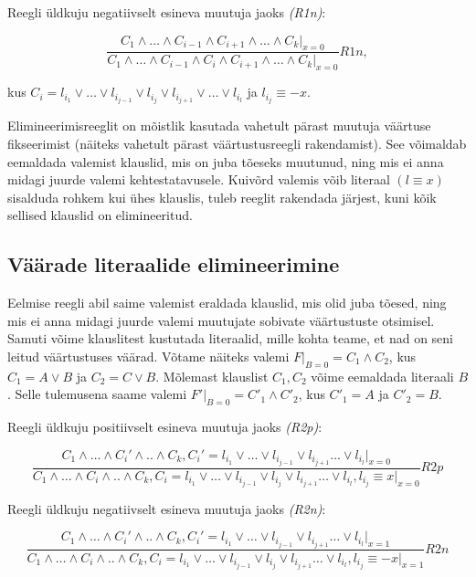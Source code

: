 \documentclass[12pt,estonian]{report}
\begin{document}
Reegli üldkuju negatiivselt esineva muutuja jaoks \emph{(R1n)}:

\[
\frac{C_{1}\wedge\dots\wedge C_{i-1}\wedge C_{i+1}\wedge\dots\wedge C_{k}|_{x=0}}{C_{1}\wedge\dots\wedge C_{i-1}\wedge C_{i}\wedge C_{i+1}\wedge\dots\wedge C_{k}|_{x=0}}R1n,\]

kus $C_{i}=l_{i_{1}}\vee\dots\vee l_{i_{j-1}}\vee l_{i_{j}}\vee l_{i_{j+1}}\vee\dots\vee l_{i_{l}}$ ja $l_{i_{j}}\equiv -x$.


Elimineerimisreeglit on mõistlik kasutada vahetult pärast muutuja
väärtuse fikseerimist (näiteks vahetult pärast väärtustusreegli rakendamist).
See võimaldab eemaldada valemist klauslid, mis on juba tõeseks muutunud,
ning mis ei anna midagi juurde valemi kehtestatavusele. Kuivõrd valemis
võib literaal $(l\equiv x)$ sisalduda rohkem kui ühes klauslis, tuleb
reeglit rakendada järjest, kuni kõik sellised klauslid on elimineeritud.


\subsection{Väärade literaalide elimineerimine}

Eelmise reegli abil saime valemist eraldada klauslid, mis olid juba
tõesed, ning mis ei anna midagi juurde valemi muutujate sobivate väärtustuste
otsimisel. Samuti võime klauslitest kustutada literaalid, mille kohta
teame, et nad on seni leitud väärtustuses väärad. Võtame näiteks valemi
$F|_{B=0}=C_{1}\wedge C_{2}$, kus $C_{1}=A\vee B$ ja $C_{2}=C\vee B$.
Mõlemast klauslist $C_{1},C_{2}$ võime eemaldada literaali $B$.
Selle tulemusena saame valemi $F'|_{B=0}=C'_{1}\wedge C'_{2}$, kus
$C'_{1}=A$ ja $C'_{2}=B$.

Reegli üldkuju positiivselt esineva muutuja jaoks \emph{(R2p)}:

\[
\frac{C_{1}\wedge\dots\wedge C_{i}'\wedge..\wedge C_{k},C_{i}'=l_{i_{1}}\vee\dots\vee l_{i_{j-1}}\vee l_{i_{j+1}}\dots\vee l_{i_{l}}|_{x=0}}{C_{1}\wedge\dots\wedge C_{i}\wedge..\wedge C_{k},C_{i}=l_{i_{1}}\vee\dots\vee l_{i_{j-1}}\vee l_{i_{j}}\vee l_{i_{j+1}}\dots\vee l_{i_{l}},l_{i_{j}}\equiv x|_{x=0}}R2p\]


Reegli üldkuju negatiivselt esineva muutuja jaoks \emph{(R2n)}:

\[
\frac{C_{1}\wedge\dots\wedge C_{i}'\wedge..\wedge C_{k},C_{i}'=l_{i_{1}}\vee\dots\vee l_{i_{j-1}}\vee l_{i_{j+1}}\dots\vee l_{i_{l}}|_{x=1}}{C_{1}\wedge\dots\wedge C_{i}\wedge..\wedge C_{k},C_{i}=l_{i_{1}}\vee\dots\vee l_{i_{j-1}}\vee l_{i_{j}}\vee l_{i_{j+1}}\dots\vee l_{i_{l}},l_{i_{j}}\equiv-x|_{x=1}}R2n\]
\end{document}
